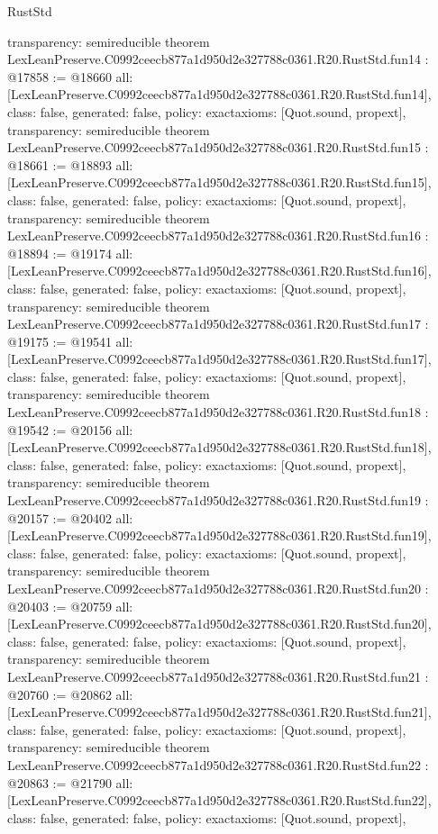 \begin{lexlean}{RustStd}
\begin{coremodule}
{  transparency: semireducible
}
theorem LexLeanPreserve.C0992ceecb877a1d950d2e327788c0361.R20.RustStd.fun14 : @17858 := @18660 {
  all: [LexLeanPreserve.C0992ceecb877a1d950d2e327788c0361.R20.RustStd.fun14],
  class: false,
  generated: false,
  policy: exact{axioms: [Quot.sound, propext]},
  transparency: semireducible
}
theorem LexLeanPreserve.C0992ceecb877a1d950d2e327788c0361.R20.RustStd.fun15 : @18661 := @18893 {
  all: [LexLeanPreserve.C0992ceecb877a1d950d2e327788c0361.R20.RustStd.fun15],
  class: false,
  generated: false,
  policy: exact{axioms: [Quot.sound, propext]},
  transparency: semireducible
}
theorem LexLeanPreserve.C0992ceecb877a1d950d2e327788c0361.R20.RustStd.fun16 : @18894 := @19174 {
  all: [LexLeanPreserve.C0992ceecb877a1d950d2e327788c0361.R20.RustStd.fun16],
  class: false,
  generated: false,
  policy: exact{axioms: [Quot.sound, propext]},
  transparency: semireducible
}
theorem LexLeanPreserve.C0992ceecb877a1d950d2e327788c0361.R20.RustStd.fun17 : @19175 := @19541 {
  all: [LexLeanPreserve.C0992ceecb877a1d950d2e327788c0361.R20.RustStd.fun17],
  class: false,
  generated: false,
  policy: exact{axioms: [Quot.sound, propext]},
  transparency: semireducible
}
theorem LexLeanPreserve.C0992ceecb877a1d950d2e327788c0361.R20.RustStd.fun18 : @19542 := @20156 {
  all: [LexLeanPreserve.C0992ceecb877a1d950d2e327788c0361.R20.RustStd.fun18],
  class: false,
  generated: false,
  policy: exact{axioms: [Quot.sound, propext]},
  transparency: semireducible
}
theorem LexLeanPreserve.C0992ceecb877a1d950d2e327788c0361.R20.RustStd.fun19 : @20157 := @20402 {
  all: [LexLeanPreserve.C0992ceecb877a1d950d2e327788c0361.R20.RustStd.fun19],
  class: false,
  generated: false,
  policy: exact{axioms: [Quot.sound, propext]},
  transparency: semireducible
}
theorem LexLeanPreserve.C0992ceecb877a1d950d2e327788c0361.R20.RustStd.fun20 : @20403 := @20759 {
  all: [LexLeanPreserve.C0992ceecb877a1d950d2e327788c0361.R20.RustStd.fun20],
  class: false,
  generated: false,
  policy: exact{axioms: [Quot.sound, propext]},
  transparency: semireducible
}
theorem LexLeanPreserve.C0992ceecb877a1d950d2e327788c0361.R20.RustStd.fun21 : @20760 := @20862 {
  all: [LexLeanPreserve.C0992ceecb877a1d950d2e327788c0361.R20.RustStd.fun21],
  class: false,
  generated: false,
  policy: exact{axioms: [Quot.sound, propext]},
  transparency: semireducible
}
theorem LexLeanPreserve.C0992ceecb877a1d950d2e327788c0361.R20.RustStd.fun22 : @20863 := @21790 {
  all: [LexLeanPreserve.C0992ceecb877a1d950d2e327788c0361.R20.RustStd.fun22],
  class: false,
  generated: false,
  policy: exact{axioms: [Quot.sound, propext]},
}
\end{coremodule}
\end{lexlean}
